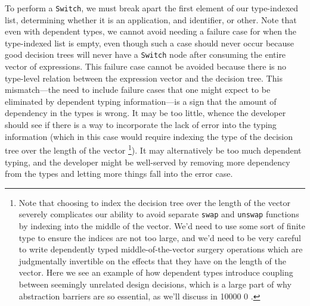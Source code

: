 To perform a \texttt{Switch}, we must break apart the first element of our type-indexed list, determining whether it is an application, and identifier, or other.
Note that even with dependent types, we cannot avoid needing a failure case for when the type-indexed list is empty, even though such a case should never occur because good decision trees will never have a \texttt{Switch} node after consuming the entire vector of expressions.
This failure case cannot be avoided because there is no type-level relation between the expression vector and the decision tree.
This mismatch---the need to include failure cases that one might expect to be eliminated by dependent typing information---is a sign that the amount of dependency in the types is wrong.
It may be too little, whence the developer should see if there is a way to incorporate the lack of error into the typing information (which in this case would require indexing the type of the decision tree over the length of the vector%
\label{sec:break-abstraction:example:decision-tree-indexing}%
\footnote{\label{foot:break-abstraction:example:decision-tree-indexing}%
  Note that choosing to index the decision tree over the length of the vector severely complicates our ability to avoid separate \texttt{swap} and \texttt{unswap} functions by indexing into the middle of the vector.
  We'd need to use some sort of finite type to ensure the indices are not too large, and we'd need to be very careful to write dependently typed middle-of-the-vector surgery operations which are judgmentally invertible on the effects that they have on the length of the vector.
  Here we see an example of how dependent types introduce coupling between seemingly unrelated design decisions, which is a large part of why abstraction barriers are so essential, as we'll discuss in
   10000 0\relax
  .
}).
It may alternatively be too much dependent typing, and the developer might be well-served by removing more dependency from the types and letting more things fall into the error case.

